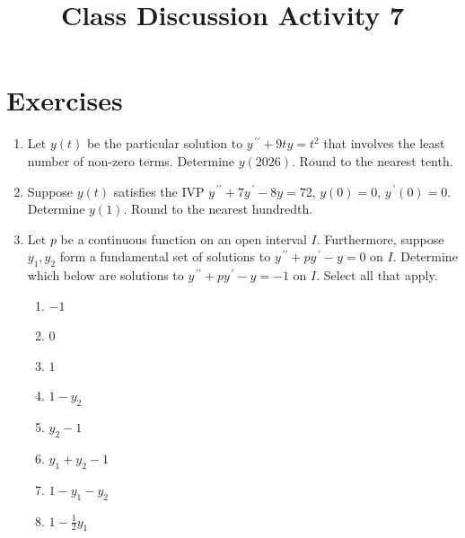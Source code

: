 \documentclass{ximera}
\begin{document}
\begin{abstract}
 \end{abstract}

    \title{Class Discussion Activity 7}
    
    \maketitle

\section*{Exercises}



\begin{enumerate}[label=(\arabic*)]

\item Let $y(t)$ be the particular solution to $y^{\,\prime\prime}+9ty=t^2$ that involves the least number of non-zero terms.   Determine $y(2026)$.  Round to the nearest tenth. 


\item Suppose $y(t)$ satisfies the IVP $y^{\,\prime\prime}+7y^{\,\prime}-8y=72$, $y(0)=0$, $y^{\,\prime}(0)=0$. Determine $y(1)$.  Round to the nearest hundredth.





\item Let $p$ be a continuous function on an open interval $I$.  Furthermore, suppose $y_1,y_2$ form a fundamental set of solutions to $y^{\,\prime\prime}+py^{\,\prime}-y=0$ on $I$.  Determine which below are solutions to $y^{\,\prime\prime}+py^{\,\prime}-y=-1$  on $I$.  Select all that apply.


\begin{enumerate}[label=(\alph*)]
\item $-1$  
\item $0$
\item $1$  %
\item $1-y_2$ %
\item $y_2-1$ 
\item $y_1+y_2-1$  
\item $1-y_1-y_2$ %
\item $1-\displaystyle \frac{1}{2}y_1$ %
\end{enumerate}


\end{enumerate}
\end{document}
